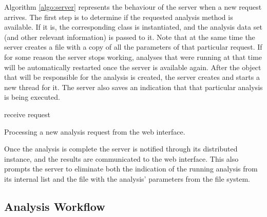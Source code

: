 Algorithm \ref{algo:server} represents the behaviour of the server when a new
request arrives. The first step is to determine if the requested analysis method
is available. If it is, the corresponding class is instantiated, and the
analysis data set (and other relevant information) is passed to it. Note that
at the same time the server creates a file with a copy of all the parameters of
that particular request. If for some reason the server stops working, analyses
that were running at that time will be automatically restarted once the server
is available again. After the object that will be responsible for the analysis
is created, the server creates and starts a new thread for it. The server also
saves an indication that that particular analysis is being executed.

\begin{algorithm}
  receive request\;
  \BlankLine

  \caption[Processing a new analysis request from the web interface]{
    Processing a new analysis request from the web interface.
  }
  \label{algo:server}
\end{algorithm}

Once the analysis is complete the server is notified through its distributed
instance, and the results are communicated to the web interface. This also
prompts the server to eliminate both the indication of the running analysis from
its internal list and the file with the analysis' parameters from the file
system.


\subsection{Analysis Workflow}


